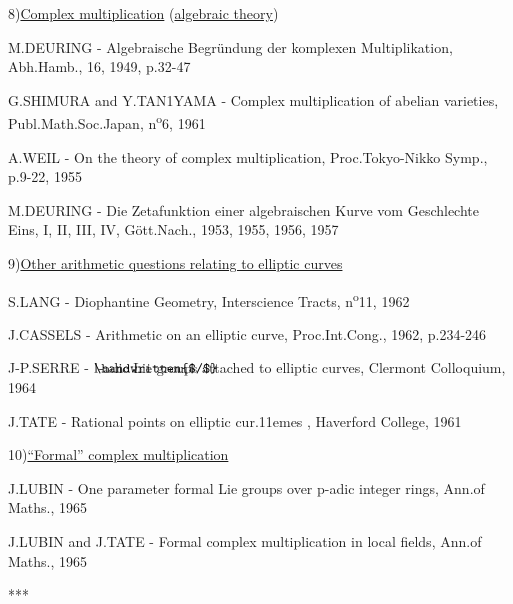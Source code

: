 \clearpage
{}
\reversemarginpar
{}
\normalmarginpar
{}

8)\quad \uline{Complex multiplication} (\uline{algebraic theory})

M.DEURING - Algebraische Begründung der komplexen Multiplikation, Abh.Hamb., 16, 1949, p.32-47

\reversemarginpar
{}
G.SHIMURA and Y.TAN1YAMA - Complex multiplication of abelian varieties, Publ.Math.Soc.Japan, n\textsuperscript{o}6, 1961

A.WEIL - On the theory of complex multiplication, Proc.Tokyo-Nikko Symp., p.9-22, 1955

M.DEURING - Die Zetafunktion einer algebraischen Kurve vom Geschlechte Eins, I, II, III, IV, Gött.Nach., 1953, 1955, 1956, 1957

9)\quad \uline{Other arithmetic questions relating to elliptic curves}

S.LANG - Diophantine Geometry, Interscience Tracts, n\textsuperscript{o}11, 1962

J.CASSELS - Arithmetic on an elliptic curve, Proc.Int.Cong., 1962, p.234-246

J-P.SERRE - $\mathord{\rlap{\handwritten{$/$}}\mathrm{l}}$-adic Lie groups attached to elliptic curves, Clermont Colloquium, 1964

J.TATE - Rational points on elliptic cur\makebox[0pt][l]{\deleted{:}}\kern.11emes , Haverford College, 1961

10)\quad \uline{``Formal'' complex multiplication}

J.LUBIN - One parameter formal Lie groups over $\mathrm{p}$-adic integer rings, Ann.of Maths., 1965

J.LUBIN and J.TATE - Formal complex multiplication in local fields, Ann.of Maths., 1965

\begin{center}
***
\end{center}
\normalmarginpar

